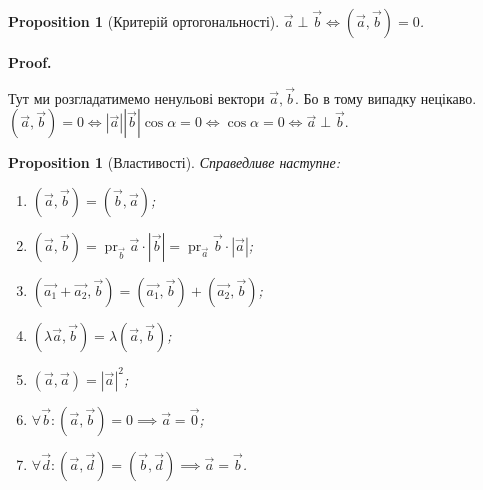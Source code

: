 \documentclass[a4paper, 10pt]{extarticle}
\makeatletter
\def\qed{$\blacksquare$}
\def\qed{$\blacksquare$}
\theoremstyle{theoremdd}
\theoremstyle{theoremdd}
\theoremstyle{theoremdd}
\theoremstyle{theoremdd}
\theoremstyle{theoremdd}
\newtheorem{proposition}[theorem]{Proposition}
\theoremstyle{theoremdd}
\theoremstyle{theoremdd}
\theoremstyle{theoremdd}
\renewenvironment{proof}[1][Proof.\\]{\par
\pushQED{\hfill \qed}%
\normalfont \topsep6\p@\@plus6\p@\relax
\trivlist
\item\relax
{\bfseries
#1\@addpunct{.}}\hspace\labelsep\ignorespaces
}{%
\popQED\endtrivlist\@endpefalse
}
\DeclareMathOperator{\pr}{pr}
\makeatother
\begin{document}
\begin{proposition}[Критерій ортогональності]
	$\vec{a} \perp \vec{b} \iff (\vec{a}, \vec{b}) = 0$.
\end{proposition}

\begin{proof}
Тут ми розгладатимемо ненульові вектори $\vec{a},\vec{b}$. Бо в тому випадку нецікаво.\\
	$(\vec{a}, \vec{b}) = 0 \iff |\vec{a}| |\vec{b}| \cos \alpha = 0 \iff \cos \alpha = 0 \iff \vec{a} \perp \vec{b}$.
\end{proof}

\begin{proposition}[Властивості]
Справедливе наступне:
\begin{enumerate}[nosep,wide=0pt,label={\arabic*)}]
	\item $(\vec{a}, \vec{b}) = (\vec{b}, \vec{a})$;
	\item $(\vec{a}, \vec{b}) = \pr_{\vec{b}} \vec{a} \cdot |\vec{b}| = \pr_{\vec{a}} \vec{b} \cdot |\vec{a}|$;
	\item $(\vec{a_1}+\vec{a_2}, \vec{b}) = (\vec{a_1}, \vec{b}) + (\vec{a_2}, \vec{b})$;
	\item $(\lambda \vec{a}, \vec{b}) = \lambda (\vec{a}, \vec{b})$;
	\item $(\vec{a}, \vec{a}) = |\vec{a}|^2$;
	\item $\forall \vec{b}: (\vec{a}, \vec{b}) = 0 \implies \vec{a} = \vec{0}$;
	\item $\forall \vec{d}: (\vec{a}, \vec{d}) = (\vec{b}, \vec{d}) \implies \vec{a} = \vec{b}$.
\end{enumerate}
\end{proposition}
\end{document}
